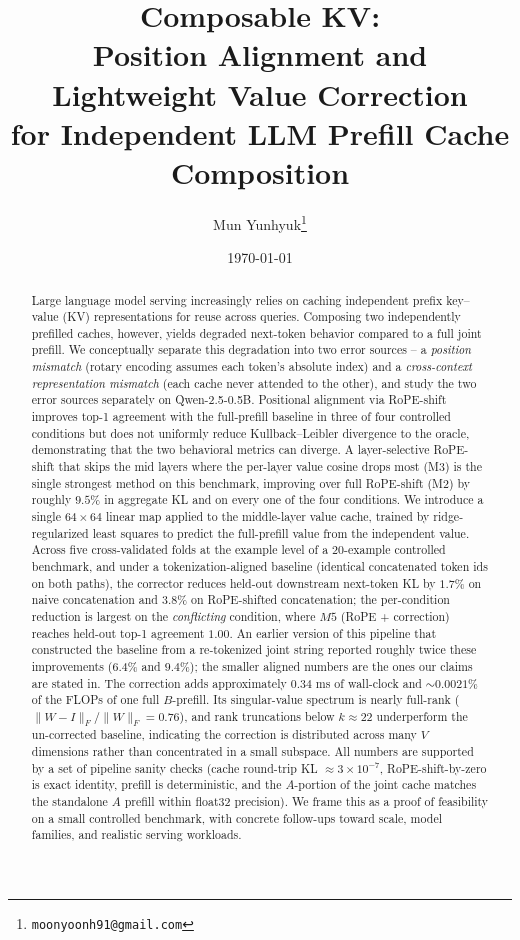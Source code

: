 \documentclass[11pt]{article}
\title{Composable KV:\\ Position Alignment and Lightweight Value Correction\\ for Independent LLM Prefill Cache Composition}
\author[1]{Mun Yunhyuk\thanks{\texttt{moonyoonh91@gmail.com}}}
\affil[1]{Independent research}
\date{\today}
\begin{document}
\maketitle

\begin{abstract}
Large language model serving increasingly relies on caching independent prefix key--value (KV) representations for reuse across queries. Composing two independently prefilled caches, however, yields degraded next-token behavior compared to a full joint prefill. We conceptually separate this degradation into two error sources -- a \emph{position mismatch} (rotary encoding assumes each token's absolute index) and a \emph{cross-context representation mismatch} (each cache never attended to the other), and study the two error sources separately on Qwen-2.5-0.5B. Positional alignment via RoPE-shift improves top-1 agreement with the full-prefill baseline in three of four controlled conditions but does not uniformly reduce Kullback--Leibler divergence to the oracle, demonstrating that the two behavioral metrics can diverge. A layer-selective RoPE-shift that skips the mid layers where the per-layer value cosine drops most (M3) is the single strongest method on this benchmark, improving over full RoPE-shift (M2) by roughly $9.5\%$ in aggregate KL and on every one of the four conditions. We introduce a single $64\times64$ linear map applied to the middle-layer value cache, trained by ridge-regularized least squares to predict the full-prefill value from the independent value. Across five cross-validated folds at the example level of a $20$-example controlled benchmark, and under a tokenization-aligned baseline (identical concatenated token ids on both paths), the corrector reduces held-out downstream next-token KL by $1.7\%$ on naive concatenation and $3.8\%$ on RoPE-shifted concatenation; the per-condition reduction is largest on the \emph{conflicting} condition, where $M5$ (RoPE + correction) reaches held-out top-1 agreement $1.00$. An earlier version of this pipeline that constructed the baseline from a re-tokenized joint string reported roughly twice these improvements ($6.4\%$ and $9.4\%$); the smaller aligned numbers are the ones our claims are stated in. The correction adds approximately $0.34$ ms of wall-clock and $\sim 0.0021\%$ of the FLOPs of one full $B$-prefill. Its singular-value spectrum is nearly full-rank ($\lVert W - I \rVert_F / \lVert W \rVert_F = 0.76$), and rank truncations below $k \approx 22$ underperform the un-corrected baseline, indicating the correction is distributed across many $V$ dimensions rather than concentrated in a small subspace. All numbers are supported by a set of pipeline sanity checks (cache round-trip KL $\approx 3\times10^{-7}$, RoPE-shift-by-zero is exact identity, prefill is deterministic, and the $A$-portion of the joint cache matches the standalone $A$ prefill within float32 precision). We frame this as a proof of feasibility on a small controlled benchmark, with concrete follow-ups toward scale, model families, and realistic serving workloads.
\end{abstract}
\end{document}
